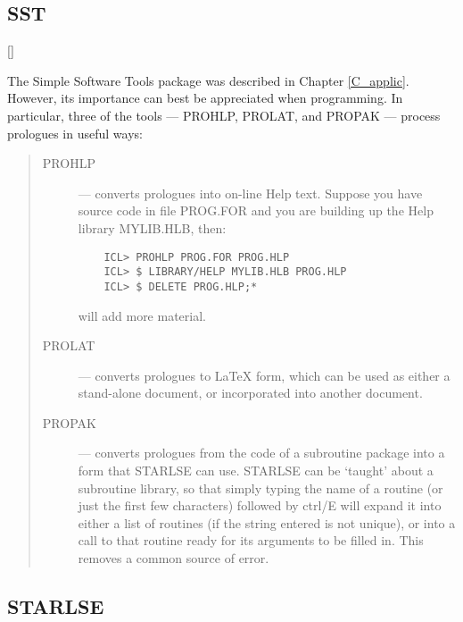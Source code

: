 \subsection{SST}

\vspace{-10mm}

\hfill []

\vspace{2mm}

The Simple Software Tools package was described in Chapter \ref{C_applic}.
However, its importance can best be appreciated when programming.
In particular, three of the tools --- PROHLP, PROLAT, and PROPAK --- process
prologues in useful ways:

\begin{small}
\begin{quote}
\begin{description}

\item [PROHLP] --- converts prologues into on-line Help text.
Suppose you have source code in file PROG.FOR and you are building up the Help
library MYLIB.HLB, then:

\begin{verbatim}
    ICL> PROHLP PROG.FOR PROG.HLP
    ICL> $ LIBRARY/HELP MYLIB.HLB PROG.HLP
    ICL> $ DELETE PROG.HLP;*
\end{verbatim}

will add more material.

\item [PROLAT] --- converts prologues to \LaTeX\/ form, which can be used as
either a stand-alone document, or incorporated into another document.

\item [PROPAK] --- converts prologues from the code of a subroutine package
into a form that STARLSE can use.
STARLSE can be `taught' about a subroutine library, so that simply typing
the name of a routine (or just the first few characters) followed by
ctrl/E will expand it into either a list of routines (if the string entered
is not unique), or into a call to that routine ready for its arguments to be
filled in.
This removes a common source of error.

\end{description}
\end{quote}
\end{small}

\subsection{STARLSE}

